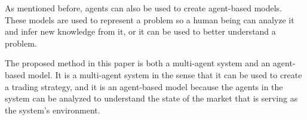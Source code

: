 As mentioned before, agents can also be used to create agent-based models. These
models are used to represent a problem so a human being can analyze it and infer
new knowledge from it, or it can be used to better understand a problem.

The proposed method in this paper is both a multi-agent system and an
agent-based model. It is a multi-agent system in the sense that it can be used
to create a trading strategy, and it is an agent-based model because the agents
in the system can be analyzed to understand the state of the market that is
serving as the system's environment.
